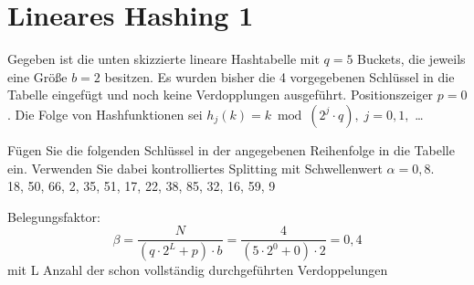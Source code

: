 \section{Lineares Hashing 1}

Gegeben ist die unten skizzierte lineare Hashtabelle mit $q = 5$ Buckets, die jeweils eine Größe $b = 2$ besitzen. Es wurden bisher die 4 vorgegebenen Schlüssel in die Tabelle eingefügt und noch keine Verdopplungen ausgeführt. Positionszeiger $p = 0$. Die Folge von Hashfunktionen sei $h_{j}(k) = k \bmod(2^{j} \cdot q), \; j = 0,1,$ \ldots

Fügen Sie die folgenden Schlüssel in der angegebenen Reihenfolge in die Tabelle ein. Verwenden Sie dabei kontrolliertes Splitting mit Schwellenwert $\alpha = 0,8$. \\
18, 50, 66, 2, 35, 51, 17, 22, 38, 85, 32, 16, 59, 9

\begin{minipage}{5cm}
\end{minipage} \hfill
\begin{minipage}{0.65\textwidth}
Belegungsfaktor:
\[\beta = \frac{N}{ (q \cdot 2^{L} + p) \cdot b} = \frac{4}{(5 \cdot 2^{0} + 0) \cdot 2} = 0,4\]
mit L Anzahl der schon vollständig durchgeführten Verdoppelungen
\end{minipage}


